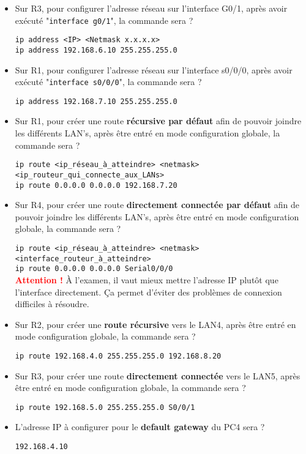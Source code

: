 \documentclass[a4paper]{article}
\begin{document}
\begin{itemize}
    \item Sur R3, pour configurer l'adresse réseau sur l'interface G0/1, après avoir exécuté "\texttt{interface g0/1}", la commande sera ?
    \begin{example}
        \texttt{ip address <IP> <Netmask x.x.x.x>} \\
        \texttt{ip address 192.168.6.10 255.255.255.0}
    \end{example}
    \item Sur R1, pour configurer l'adresse réseau sur l'interface s0/0/0, après avoir exécuté "\texttt{interface s0/0/0}", la commande sera ?
    \begin{example}
        \texttt{ip address 192.168.7.10 255.255.255.0}
    \end{example}
    \item Sur R1, pour créer une route \textbf{récursive par défaut} afin de pouvoir joindre les différents LAN's, après être entré en mode configuration globale, la commande sera ?
    \begin{example}
        \texttt{ip route <ip\_réseau\_à\_atteindre> <netmask> <ip\_routeur\_qui\_connecte\_aux\_LANs>} \\
        \texttt{ip route 0.0.0.0 0.0.0.0 192.168.7.20}
    \end{example}
    \item Sur R4, pour créer une route \textbf{directement connectée par défaut} afin de pouvoir joindre les différents LAN's, après être entré en mode configuration globale, la commande sera ?
    \begin{example}
        \texttt{ip route <ip\_réseau\_à\_atteindre> <netmask> <interface\_routeur\_à\_atteindre>} \\
        \texttt{ip route 0.0.0.0 0.0.0.0 Serial0/0/0} \\
        \textcolor{red}{\textbf{Attention !}} À l'examen, il vaut mieux mettre l'adresse IP plutôt que l'interface directement. Ça permet d'éviter des problèmes de connexion difficiles à résoudre.
    \end{example}
    \item Sur R2, pour créer une \textbf{route récursive} vers le LAN4, après être entré en mode configuration globale, la commande sera ?
    \begin{example}
        \texttt{ip route 192.168.4.0 255.255.255.0 192.168.8.20}
    \end{example}
    \item Sur R3, pour créer une route \textbf{directement connectée} vers le LAN5, après être entré en mode configuration globale, la commande sera ?
    \begin{example}
        \texttt{ip route 192.168.5.0 255.255.255.0 S0/0/1}
    \end{example}
    \item L'adresse IP à configurer pour le \textbf{default gateway} du PC4 sera ?
    \begin{example}
        \texttt{192.168.4.10}
    \end{example}
\end{itemize}
\end{document}
